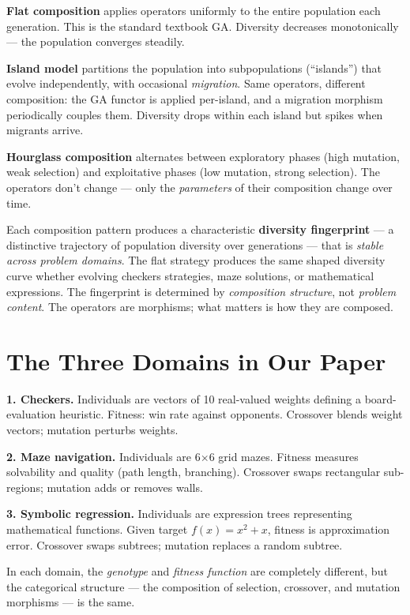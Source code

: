 \documentclass[11pt]{article}
\begin{document}
\textbf{Flat composition} applies operators uniformly to the entire population each generation. This is the standard textbook GA. Diversity decreases monotonically --- the population converges steadily.

\textbf{Island model} partitions the population into subpopulations (``islands'') that evolve independently, with occasional \emph{migration}. Same operators, different composition: the GA functor is applied per-island, and a migration morphism periodically couples them. Diversity drops within each island but spikes when migrants arrive.

\textbf{Hourglass composition} alternates between exploratory phases (high mutation, weak selection) and exploitative phases (low mutation, strong selection). The operators don't change --- only the \emph{parameters} of their composition change over time.

Each composition pattern produces a characteristic \textbf{diversity fingerprint} --- a distinctive trajectory of population diversity over generations --- that is \emph{stable across problem domains}. The flat strategy produces the same shaped diversity curve whether evolving checkers strategies, maze solutions, or mathematical expressions. The fingerprint is determined by \emph{composition structure}, not \emph{problem content}. The operators are morphisms; what matters is how they are composed.

\section*{The Three Domains in Our Paper}

\textbf{1. Checkers.} Individuals are vectors of 10 real-valued weights defining a board-evaluation heuristic. Fitness: win rate against opponents. Crossover blends weight vectors; mutation perturbs weights.

\textbf{2. Maze navigation.} Individuals are 6$\times$6 grid mazes. Fitness measures solvability and quality (path length, branching). Crossover swaps rectangular sub-regions; mutation adds or removes walls.

\textbf{3. Symbolic regression.} Individuals are expression trees representing mathematical functions. Given target $f(x) = x^2 + x$, fitness is approximation error. Crossover swaps subtrees; mutation replaces a random subtree.

In each domain, the \emph{genotype} and \emph{fitness function} are completely different, but the categorical structure --- the composition of selection, crossover, and mutation morphisms --- is the same.
\end{document}
